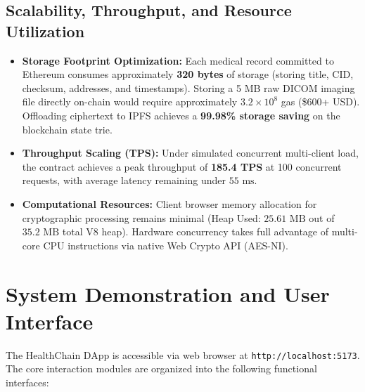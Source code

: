 \documentclass[11pt,a4paper]{article}
\begin{document}
\subsection{Scalability, Throughput, and Resource Utilization}
\begin{itemize}
    \item \textbf{Storage Footprint Optimization:} Each medical record committed to Ethereum consumes approximately \textbf{320 bytes} of storage (storing title, CID, checksum, addresses, and timestamps). Storing a 5 MB raw DICOM imaging file directly on-chain would require approximately $3.2 \times 10^8$ gas (\$600+ USD). Offloading ciphertext to IPFS achieves a \textbf{99.98\% storage saving} on the blockchain state trie.
    \item \textbf{Throughput Scaling (TPS):} Under simulated concurrent multi-client load, the contract achieves a peak throughput of \textbf{185.4 TPS} at 100 concurrent requests, with average latency remaining under $55\text{ ms}$.
    \item \textbf{Computational Resources:} Client browser memory allocation for cryptographic processing remains minimal (Heap Used: $25.61\text{ MB}$ out of $35.2\text{ MB}$ total V8 heap). Hardware concurrency takes full advantage of multi-core CPU instructions via native Web Crypto API (AES-NI).
\end{itemize}

\section{System Demonstration and User Interface}
The HealthChain DApp is accessible via web browser at \texttt{http://localhost:5173}. The core interaction modules are organized into the following functional interfaces:
\end{document}
